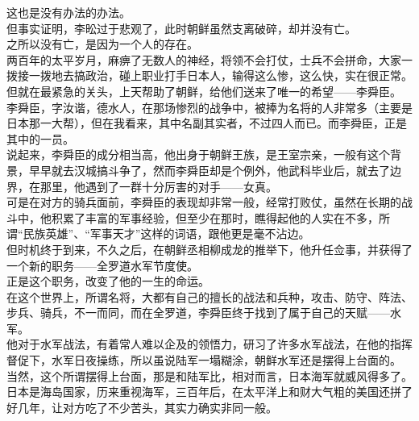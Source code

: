 \begin{multicols}{\theparacolNo}
这也是没有办法的办法。\\

但事实证明，李昖过于悲观了，此时朝鲜虽然支离破碎，却并没有亡。\\

之所以没有亡，是因为一个人的存在。\\

两百年的太平岁月，麻痹了无数人的神经，将领不会打仗，士兵不会拼命，大家一拨接一拨地去搞政治，碰上职业打手日本人，输得这么惨，这么快，实在很正常。\\

但就在最紧急的关头，上天帮助了朝鲜，给他们送来了唯一的希望——李舜臣。\\

李舜臣，字汝谐，德水人，在那场惨烈的战争中，被捧为名将的人非常多（主要是日本那一大帮），但在我看来，其中名副其实者，不过四人而已。而李舜臣，正是其中的一员。\\

说起来，李舜臣的成分相当高，他出身于朝鲜王族，是王室宗亲，一般有这个背景，早早就去汉城搞斗争了，然而李舜臣却是个例外，他武科毕业后，就去了边界，在那里，他遇到了一群十分厉害的对手——女真。\\

可是在对方的骑兵面前，李舜臣的表现却非常一般，经常打败仗，虽然在长期的战斗中，他积累了丰富的军事经验，但至少在那时，瞧得起他的人实在不多，所谓“民族英雄”、“军事天才”这样的词语，跟他更是毫不沾边。\\

但时机终于到来，不久之后，在朝鲜丞相柳成龙的推举下，他升任佥事，并获得了一个新的职务——全罗道水军节度使。\\

正是这个职务，改变了他的一生的命运。\\

在这个世界上，所谓名将，大都有自己的擅长的战法和兵种，攻击、防守、阵法、步兵、骑兵，不一而同，而在全罗道，李舜臣终于找到了属于自己的天赋——水军。\\

他对于水军战法，有着常人难以企及的领悟力，研习了许多水军战法，在他的指挥督促下，水军日夜操练，所以虽说陆军一塌糊涂，朝鲜水军还是摆得上台面的。\\

当然，这个所谓摆得上台面，那是和陆军比，相对而言，日本海军就威风得多了。\\

日本是海岛国家，历来重视海军，三百年后，在太平洋上和财大气粗的美国还拼了好几年，让对方吃了不少苦头，其实力确实非同一般。\\


\end{multicols}
